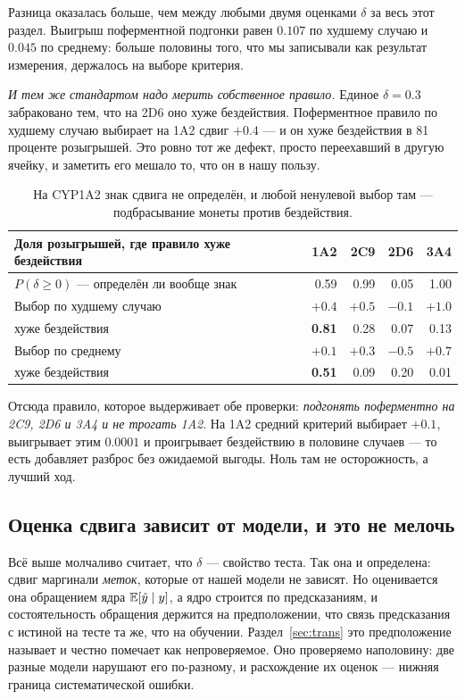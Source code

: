 Разница оказалась больше, чем между любыми двумя оценками $\delta$ за весь этот раздел.
Выигрыш поферментной подгонки равен $0.107$ по худшему случаю и $0.045$ по среднему: больше
половины того, что мы записывали как результат измерения, держалось на выборе критерия.

\emph{И тем же стандартом надо мерить собственное правило.} Единое $\delta = 0.3$ забраковано
тем, что на 2D6 оно хуже бездействия. Поферментное правило по худшему случаю выбирает на 1A2
сдвиг $+0.4$ --- и он хуже бездействия в 81 проценте розыгрышей. Это ровно тот же дефект,
просто переехавший в другую ячейку, и заметить его мешало то, что он в нашу пользу.

\begin{table}[htbp]\centering\small
\begin{tabularx}{\textwidth}{@{}Xrrrr@{}}
\toprule
Доля розыгрышей, где правило хуже бездействия & 1A2 & 2C9 & 2D6 & 3A4 \\
\midrule
$P(\delta \ge 0)$ --- определён ли вообще знак & 0.59 & 0.99 & 0.05 & 1.00 \\
\addlinespace[2pt]
Выбор по худшему случаю & $+0.4$ & $+0.5$ & $-0.1$ & $+1.0$ \\
\quad хуже бездействия  & \textbf{0.81} & 0.28 & 0.07 & 0.13 \\
\addlinespace[2pt]
Выбор по среднему      & $+0.1$ & $+0.3$ & $-0.5$ & $+0.7$ \\
\quad хуже бездействия & \textbf{0.51} & 0.09 & 0.20 & 0.01 \\
\bottomrule
\end{tabularx}
\caption{На CYP1A2 знак сдвига не определён, и любой ненулевой выбор там --- подбрасывание
монеты против бездействия.}
\label{tab:sym}
\end{table}

Отсюда правило, которое выдерживает обе проверки: \emph{подгонять поферментно на 2C9, 2D6 и
3A4 и не трогать 1A2}. На 1A2 средний критерий выбирает $+0.1$, выигрывает этим $0.0001$ и
проигрывает бездействию в половине случаев --- то есть добавляет разброс без ожидаемой
выгоды. Ноль там не осторожность, а лучший ход.

\subsection{Оценка сдвига зависит от модели, и это не мелочь}
\label{sec:deltamodel}

Всё выше молчаливо считает, что $\delta$ --- свойство теста. Так она и определена: сдвиг
маргинали \emph{меток}, которые от нашей модели не зависят. Но оценивается она обращением
ядра $\mathbb{E}[\hat y \mid y]$, а ядро строится по предсказаниям, и состоятельность обращения
держится на предположении, что связь предсказания с истиной на тесте та же, что на обучении.
Раздел~\ref{sec:trans} это предположение называет и честно помечает как непроверяемое. Оно
проверяемо наполовину: две разные модели нарушают его по-разному, и расхождение их оценок ---
нижняя граница систематической ошибки.

